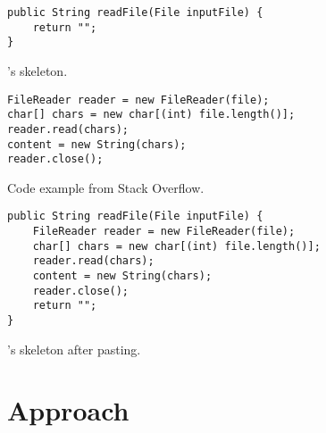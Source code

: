 \begin{center}
\begin{code}
\begin{lstlisting}[style=javastyle]
public String readFile(File inputFile) {
	return "";
}
\end{lstlisting}
\vspace{\spacebeforecaption{}}
\caption{\label{cd:before}\developer{}'s skeleton.}
\end{code}
\begin{code}
\begin{lstlisting}[style=javastyle]
FileReader reader = new FileReader(file);
char[] chars = new char[(int) file.length()];
reader.read(chars);
content = new String(chars);
reader.close();
\end{lstlisting}
\vspace{\spacebeforecaption{}}
\caption{\label{cd:example}Code example from Stack Overflow.}
\end{code}
\begin{code}
\begin{lstlisting}[style=javastyle]
public String readFile(File inputFile) {
	FileReader reader = new FileReader(file);
	char[] chars = new char[(int) file.length()];
	reader.read(chars);
	content = new String(chars);
	reader.close();
	return "";
}
\end{lstlisting}
\vspace{\spacebeforecaption{}}
\caption{\label{cd:after}\developer{}'s skeleton after pasting.}
\end{code}
\end{center}


\section*{Approach}

